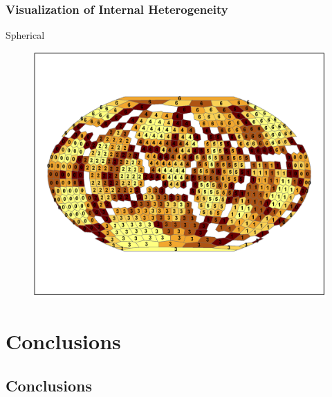 \documentclass[nototal,handout]{beamer}
\begin{document}
\begin{frame}
	\frametitle{Visualization of Internal Heterogeneity}
 
\begin{block}{Spherical}
  \begin{center}
  \begin{figure}
  \includegraphics[width=0.70\linewidth]{sphere_clusters.png}
  \end{figure}
  \end{center}
 \end{block} \end{frame} 


\section{Conclusions} 

\subsection{Conclusions} 
\end{document}
